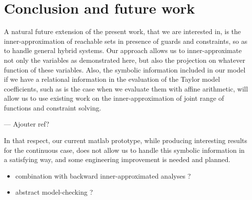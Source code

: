 \documentclass{sig-alternate-05-2015} %
\newcommand\ForAuthors[1]%
 {\par\smallskip                     %
  \begin{center}%
   \fbox%
   {\parbox{0.9\linewidth}%
    {\raggedright\sc--- #1}%
   }%
  \end{center}%
  \par\smallskip                     %
 }
\begin{document}

\section{Conclusion and future work}
%
A natural future extension of the present work, that we are interested in, is the inner-approximation of reachable sets 
in presence of guards and constraints, so as to handle general hybrid systems. Our approach allows us to inner-approximate 
not only the variables as demonstrated here, but also the projection on whatever function of these variables. Also, the 
symbolic information included in our model if we have a relational information in the evaluation of the Taylor model coefficients, 
such as is the case when we evaluate them with affine arithmetic, will allow us to use existing work on the inner-approximation 
of joint range of functions and constraint solving. 
\ForAuthors{Ajouter ref?} 
In that respect, our current matlab prototype, while producing interesting results for the continuous case, does not allow us to 
handle this symbolic information in a satisfying way, and some engineering improvement is needed and planned.


\begin{itemize}
\item combination with backward inner-approximated analyses ? 
\item abstract model-checking ? 
\end{itemize}



\end{document}
